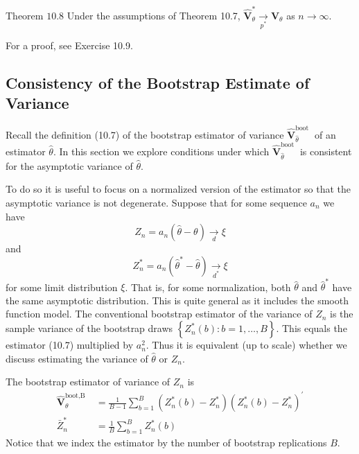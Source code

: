 \documentclass[10pt]{article}
\begin{document}
Theorem $10.8$ Under the assumptions of Theorem 10.7, $\widehat{\boldsymbol{V}}_{\theta}^{*} \underset{p^{*}}{\longrightarrow} \boldsymbol{V}_{\theta}$ as $n \rightarrow \infty$.

For a proof, see Exercise 10.9.

\subsection{Consistency of the Bootstrap Estimate of Variance}
Recall the definition (10.7) of the bootstrap estimator of variance $\widehat{\boldsymbol{V}}_{\widehat{\theta}}^{\text {boot }}$ of an estimator $\widehat{\theta}$. In this section we explore conditions under which $\widehat{\boldsymbol{V}}_{\widehat{\theta}}^{\text {boot }}$ is consistent for the asymptotic variance of $\widehat{\theta}$.

To do so it is useful to focus on a normalized version of the estimator so that the asymptotic variance is not degenerate. Suppose that for some sequence $a_{n}$ we have
$$
Z_{n}=a_{n}(\widehat{\theta}-\theta) \underset{d}{\longrightarrow} \xi
$$
and
$$
Z_{n}^{*}=a_{n}\left(\widehat{\theta}^{*}-\widehat{\theta}\right) \underset{d^{*}}{\longrightarrow} \xi
$$
for some limit distribution $\xi$. That is, for some normalization, both $\hat{\theta}$ and $\widehat{\theta}^{*}$ have the same asymptotic distribution. This is quite general as it includes the smooth function model. The conventional bootstrap estimator of the variance of $Z_{n}$ is the sample variance of the bootstrap draws $\left\{Z_{n}^{*}(b): b=1, \ldots, B\right\}$. This equals the estimator (10.7) multiplied by $a_{n}^{2}$. Thus it is equivalent (up to scale) whether we discuss estimating the variance of $\widehat{\theta}$ or $Z_{n}$.

The bootstrap estimator of variance of $Z_{n}$ is
$$
\begin{aligned}
\widehat{\boldsymbol{V}}_{\theta}^{\text {boot,B }} &=\frac{1}{B-1} \sum_{b=1}^{B}\left(Z_{n}^{*}(b)-Z_{n}^{*}\right)\left(Z_{n}^{*}(b)-Z_{n}^{*}\right)^{\prime} \\
\bar{Z}_{n}^{*} &=\frac{1}{B} \sum_{b=1}^{B} Z_{n}^{*}(b)
\end{aligned}
$$
Notice that we index the estimator by the number of bootstrap replications $B$.
\end{document}
